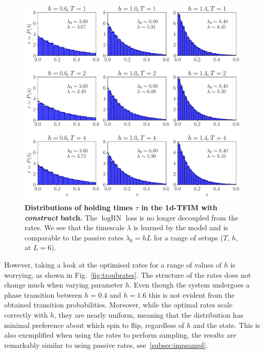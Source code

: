 \begin{figure}[H]
	\centering
	\includegraphics[width=1\linewidth]{Chapter5/Figs/Vector/troub}
	\caption[Distributions of holding times $\tau$ in the 1d-TFIM with \emph{construct} batch]{\textbf{Distributions of holding times $\tau$ in the 1d-TFIM with \emph{construct} batch.} The $\log\text{RN}$ loss is no longer decoupled from the rates. We see that the timescale $\lambda$ is learned by the model and is comparable to the passive rates $\lambda_0=hL$ for a range of setups ($T$, $h$, at $L=6$).}
	\label{fig:troub}
\end{figure}
\noindent
However, taking a look at the optimised rates for a range of values of $h$ is worrying, as shown in Fig.~\ref{fig:troubrates}. The structure of the rates does not change much when varying parameter $h$. Even though the system undergoes a phase transition between $h=0.4$ and $h=1.6$ this is not evident from the obtained transition probabilities. Moreover, while the optimal rates scale correctly with $h$, they are nearly uniform, meaning that the distribution has minimal preference about which spin to flip, regardless of $h$ and the state. This is also exemplified when using the rates to perform sampling, the results are remarkably similar to using passive rates, see~\ref{subsec:impsampl}. 
